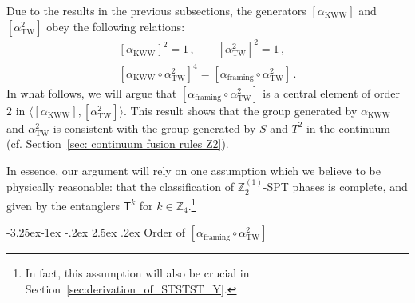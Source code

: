 \documentclass[aps,twocolumn,prx,floatfix,preprintnumbers, nofootinbib,10pt]{revtex4-2}
\makeatletter
\numberwithin{equation}{section}
\theoremstyle{definition}
\theoremstyle{remark}
\theoremstyle{claim}
\newcommand{\aKWW}{\alpha_\text{KWW}}
\newcommand{\aTW}{\alpha_\text{TW}}
\newcommand{\Z}{{\mathbb Z}}
\renewcommand\subsubsection{\@startsection{subsubsection}{3}{\z@}%
                                     {-3.25ex\@plus -1ex \@minus -.2ex}%
                                     {2.5ex \@plus .2ex}%
                                     {\centering\itshape\bfseries\small}}
\renewcommand{\sf}[1]{\mathsf{#1}}
\makeatother
\begin{document}
Due to the results in the previous subsections, the generators $[\aKWW]$ and $[\aTW^2]$ obey the following relations:
\begin{equation}
\begin{aligned}
[\aKWW]^2 = 1 \,, \qquad 
[\aTW^2]^2 = 1 \,, \\
[\aKWW \circ \aTW^2]^4 = [\alpha_{\text{framing}} \circ \aTW^2] \,.
\end{aligned}
\label{eq: Z2 ext D8}
\end{equation}
In what follows, we will argue that $[\alpha_{\text{framing}} \circ \aTW^2]$ is a central element of order $2$ in  $\langle [\aKWW], [\aTW^2] \rangle$.
This result shows that the group generated by $\aKWW$ and $\aTW^2$ is consistent with the group generated by $S$ and $T^2$ in the continuum (cf. Section~\ref{sec: continuum fusion rules Z2}).

In essence, our argument will rely on one assumption which we believe to be physically reasonable: that the classification of $\Z_2^{(1)}$-SPT phases is complete, and given by the entanglers $\sf{T}^k$ for $k \in \Z_4$.\footnote{In fact, this assumption will also be crucial in Section~\ref{sec:derivation_of_STSTST_Y}.}


\subsubsection{Order of $[\alpha_{\text{framing}} \circ \aTW^2]$}
\end{document}
